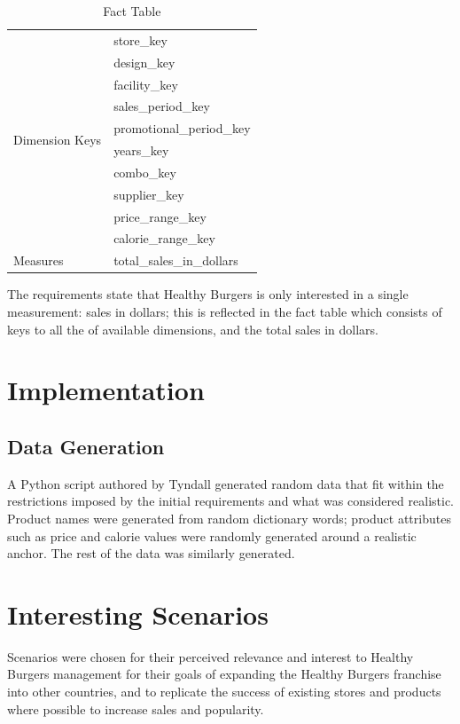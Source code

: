 \documentclass[12pt, a4paper]{article}
\begin{document}
\begin{table}
\begin{tabular}{| l | l |}
\hline
\multirow{10}{3cm}{Dimension Keys} & store\_key \\
	& design\_key \\ 
	& facility\_key \\
	& sales\_period\_key \\
	& promotional\_period\_key \\
	& years\_key \\
	& combo\_key \\
	& supplier\_key \\
	& price\_range\_key \\
	& calorie\_range\_key \\
\hline	

Measures & total\_sales\_in\_dollars \\
\hline

\end{tabular}

\caption{Fact Table}
\label{tab:fact}

\end{table}

The requirements state that Healthy Burgers is only interested in a single measurement: sales in dollars; this is reflected in the fact table which consists of keys to all the of available dimensions, and the total sales in dollars.

\section*{Implementation}

\subsection*{Data Generation}

A Python script authored by Tyndall generated random data that fit within the restrictions imposed by the initial requirements and what was considered realistic. Product names were generated from random dictionary words; product attributes such as price and calorie values were randomly generated around a realistic anchor. The rest of the data was similarly generated.

\section*{Interesting Scenarios}

Scenarios were chosen for their perceived relevance and interest to Healthy Burgers management for their goals of expanding the Healthy Burgers franchise into other countries, and to replicate the success of existing stores and products where possible to increase sales and popularity.
\end{document}
